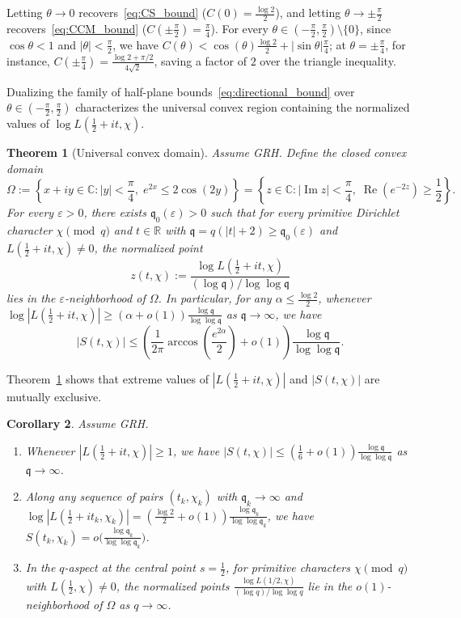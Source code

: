 \documentclass[11pt,a4paper]{amsart}
\newtheorem{theorem}{Theorem}[section]
\newtheorem{corollary}[theorem]{Corollary}
\theoremstyle{remark}
\numberwithin{equation}{section}
\newcommand{\R}{\mathbb{R}}
\newcommand{\C}{\mathbb{C}}
\newcommand{\q}{\mathfrak{q}}
\begin{document}
Letting $\theta \to 0$ recovers~\eqref{eq:CS_bound} ($C(0) = \frac{\log 2}{2}$), and letting $\theta \to \pm\frac{\pi}{2}$ recovers~\eqref{eq:CCM_bound} ($C(\pm\frac{\pi}{2}) = \frac{\pi}{4}$). For every $\theta \in (-\frac{\pi}{2},\frac{\pi}{2})\setminus\{0\}$, since $\cos\theta < 1$ and $|\theta| < \frac{\pi}{2}$, we have $C(\theta) < \cos(\theta)\frac{\log 2}{2} + |\sin\theta|\frac{\pi}{4}$; at $\theta = \pm\frac{\pi}{4}$, for instance, $C(\pm\frac{\pi}{4}) = \frac{\log 2 + \pi/2}{4\sqrt{2}}$, saving a factor of $2$ over the triangle inequality.

Dualizing the family of half-plane bounds~\eqref{eq:directional_bound} over $\theta \in (-\frac{\pi}{2},\frac{\pi}{2})$ characterizes the universal convex region containing the normalized values of $\log L(\frac{1}{2}+it,\chi)$.

\begin{theorem}[Universal convex domain]\label{thm:convex_domain}
Assume GRH. Define the closed convex domain
\[
  \Omega := \left\{x + iy \in \C : |y| < \frac{\pi}{4},\; e^{2x} \le 2\cos(2y)\right\}
  = \left\{z \in \C : |\operatorname{Im} z| < \frac{\pi}{4},\; \operatorname{Re}(e^{-2z}) \ge \frac{1}{2}\right\}.
\]
For every $\varepsilon > 0$, there exists $\q_0(\varepsilon) > 0$ such that for every primitive Dirichlet character $\chi \pmod q$ and $t \in \R$ with $\q = q(|t|+2) \ge \q_0(\varepsilon)$ and $L(\frac{1}{2}+it,\chi) \neq 0$, the normalized point
\[
  z(t,\chi) := \frac{\log L(\frac{1}{2}+it,\chi)}{(\log\q)/\log\log\q}
\]
lies in the $\varepsilon$-neighborhood of $\Omega$. In particular, for any $\alpha \le \frac{\log 2}{2}$, whenever $\log|L(\frac{1}{2}+it,\chi)| \ge (\alpha+o(1))\frac{\log\q}{\log\log\q}$ as $\q \to \infty$, we have
\begin{equation}\label{eq:tradeoff}
  |S(t,\chi)| \le \left(\frac{1}{2\pi}\arccos\!\left(\frac{e^{2\alpha}}{2}\right) + o(1)\right)\frac{\log\q}{\log\log\q}.
\end{equation}
\end{theorem}

Theorem~\ref{thm:convex_domain} shows that extreme values of $|L(\frac{1}{2}+it,\chi)|$ and $|S(t,\chi)|$ are mutually exclusive.

\begin{corollary}\label{cor:tradeoff_cases}
Assume GRH.
\begin{enumerate}
  \item[(i)] Whenever $|L(\frac{1}{2}+it,\chi)| \ge 1$, we have $|S(t,\chi)| \le (\frac{1}{6}+o(1))\frac{\log\q}{\log\log\q}$ as $\q \to \infty$.
  \item[(ii)] Along any sequence of pairs $(t_k,\chi_k)$ with $\q_k \to \infty$ and $\log|L(\frac{1}{2}+it_k,\chi_k)| = (\frac{\log 2}{2}+o(1))\frac{\log\q_k}{\log\log\q_k}$, we have $S(t_k,\chi_k) = o\bigl(\frac{\log\q_k}{\log\log\q_k}\bigr)$.
  \item[(iii)] In the $q$-aspect at the central point $s = \frac{1}{2}$, for primitive characters $\chi \pmod q$ with $L(\frac{1}{2},\chi) \neq 0$, the normalized points $\frac{\log L(1/2,\chi)}{(\log q)/\log\log q}$ lie in the $o(1)$-neighborhood of $\Omega$ as $q \to \infty$.
\end{enumerate}
\end{corollary}
\end{document}
